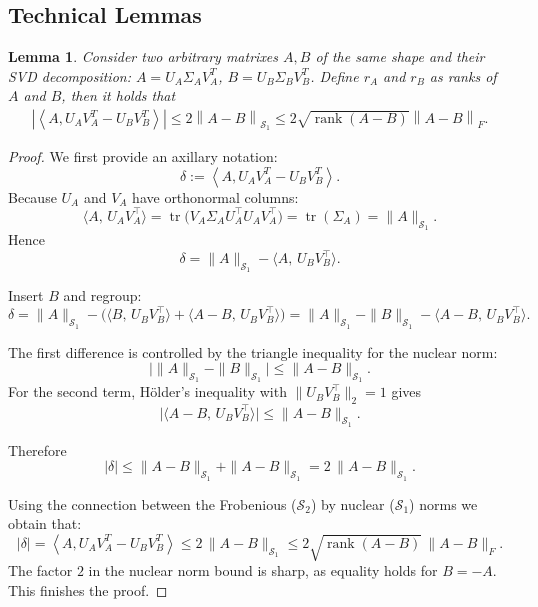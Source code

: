 \documentclass{article}
\theoremstyle{plain}
\newtheorem{lemma}[theorem]{Lemma}
\theoremstyle{definition}
\theoremstyle{remark}
\newcommand{\norm}[1]{\left\| #1 \right\|}
\newcommand{\dotprod}[2]{\left\langle #1,#2 \right\rangle}
\begin{document}
    \subsection{Technical Lemmas}
    \begin{lemma}
    \label{lemma:A_dotprod_U}
        Consider two arbitrary matrixes $A, B$ of the same shape and their SVD decomposition: $A = U_A \Sigma_A V_A^T$, $B = U_B \Sigma_B V_B^T$. Define $r_A$ and $r_B$ as ranks of $A$ and $B$, then it holds that
        \begin{align*}
            \left| \dotprod{A}{U_A V_A^T - U_B V_B^T} \right|
            \leq
            2\norm{A - B}_{\mathcal{S}_1} 
            \leq
            2\sqrt{\operatorname{rank}(A-B)} \norm{A - B}_F .
        \end{align*}
    \end{lemma}
    \begin{proof}
        We first provide an axillary notation:
        \begin{equation*}
            \delta := \dotprod{A}{U_A V_A^T - U_B V_B^T}.
        \end{equation*}
        Because $U_A$ and $V_A$ have orthonormal columns:  
        \[
        \langle A,\,U_A V_A^\top\rangle
        = \operatorname{tr}\!\bigl(V_A \Sigma_A U_A^\top U_A V_A^\top\bigr)
        = \operatorname{tr}(\Sigma_A)
        = \|A\|_{\mathcal{S}_1}.
        \]
        Hence  
        \[
        \delta
        = \|A\|_{\mathcal{S}_1} - \langle A,\,U_B V_B^\top\rangle.
        \]
    
        Insert $B$ and regroup:
        \[
        \delta
        = \|A\|_{\mathcal{S}_1}
           - \bigl(\langle B,\,U_B V_B^\top\rangle
                  + \langle A-B,\,U_B V_B^\top\rangle\bigr)
        = \|A\|_{\mathcal{S}_1} - \|B\|_{\mathcal{S}_1}
          - \langle A-B,\,U_B V_B^\top\rangle .
        \]
    
        The first difference is controlled by the triangle inequality for the nuclear norm:
        \[
        \bigl|\|A\|_{\mathcal{S}_1} - \|B\|_{\mathcal{S}_1}\bigr|
        \le \|A-B\|_{\mathcal{S}_1}.
        \]
        For the second term, Hölder’s inequality with $\|U_B V_B^\top\|_2 = 1$ gives
        \[
        \bigl|\langle A-B,\,U_B V_B^\top\rangle\bigr|
        \le \|A-B\|_{\mathcal{S}_1}.
        \]
        
        Therefore
        \[
        |\delta|
        \le \|A-B\|_{\mathcal{S}_1} + \|A-B\|_{\mathcal{S}_1}
        = 2\,\|A-B\|_{\mathcal{S}_1}.
        \]
        
        Using the connection between the Frobenious ($\mathcal{S}_2$) by nuclear ($\mathcal{S}_1$) norms we obtain that:
        \[
        |\delta|
        =
        \dotprod{A}{U_A V_A^T - U_B V_B^T}
        \le 2\,\|A-B\|_{\mathcal{S}_1}
        \le 2\sqrt{\operatorname{rank}(A-B)}\,\|A-B\|_F .
        \]
        The factor $2$ in the nuclear norm bound is sharp, as equality holds for $B=-A$. This finishes the proof.
    \end{proof}
\end{document}
